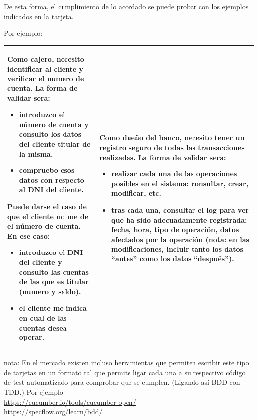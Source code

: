 \documentclass[spanish,12pt,a4paper,final,oneside]{book}
\begin{document}
De esta forma, el cumplimiento de lo acordado se puede probar con los ejemplos indicados en la tarjeta.

Por ejemplo:

\def\arraystretch{2}
\begin{longtable}{|p{7cm}|p{7cm}|}

\hline

               
Como cajero, necesito identificar al cliente y verificar el numero de cuenta. 
\newline 
La forma de validar sera:
\begin{itemize}
\item introduzco el número de cuenta y consulto los datos del cliente titular de la misma.
\item compruebo esos datos con respecto al DNI del cliente.
\end{itemize}
Puede darse el caso de que el cliente no me de el número de cuenta. En ese caso:
\begin{itemize}
\item introduzco el DNI del cliente y consulto las cuentas de las que es titular (numero y saldo).
\item el cliente me indica en cual de las cuentas desea operar.
\end{itemize}

&
                
Como dueño del banco, necesito tener un registro seguro de todas las transacciones realizadas.
\newline \newline
 La forma de validar sera:                
\begin{itemize}
\item realizar cada una de las operaciones posibles en el sistema: consultar, crear, modificar, etc.
\item tras cada una, consultar el log para ver que ha sido adecuadamente registrada: fecha, hora, tipo de operación, datos afectados por la operación (nota: en las modificaciones, incluir tanto los datos ``antes'' como los datos ``después'').
\end{itemize}
                        
\\ \hline
                

\end{longtable}



nota: En el mercado existen incluso herramientas que permiten escribir este tipo de tarjetas en un formato tal que permite ligar cada una a su respectivo código de test automatizado para comprobar que se cumplen. (Ligando así BDD con TDD.) Por ejemplo:
\\ \url{https://cucumber.io/tools/cucumber-open/}
\\ \url{https://specflow.org/learn/bdd/}
\end{document}
